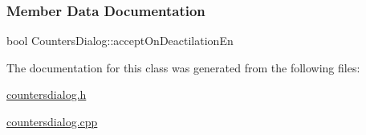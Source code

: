 \hypertarget{classCountersDialog_af1e07b5f6ecf796c44a88cf3f58698e4}{}\label{classCountersDialog_af1e07b5f6ecf796c44a88cf3f58698e4}


\subsubsection{Member Data Documentation}
{\setlength{\rightskip}{0pt plus 5cm}bool Counters\+Dialog\+::{\texorpdfstring{accept\+On\+Deactilation\+En}{acceptOnDeactilationEn}}\hspace{0.3cm}{\ttfamily [private]}}\hypertarget{classCountersDialog_ad08acae2aa8655ed9956795b54f3b862}{}\label{classCountersDialog_ad08acae2aa8655ed9956795b54f3b862}


The documentation for this class was generated from the following files\+:\begin{DoxyCompactItemize}
\item 
\hyperlink{countersdialog_8h}{countersdialog.\+h}\item 
\hyperlink{countersdialog_8cpp}{countersdialog.\+cpp}\end{DoxyCompactItemize}
\newpage